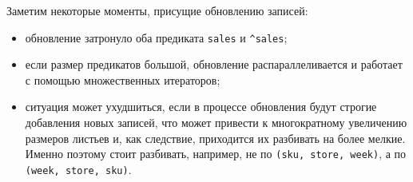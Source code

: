 Заметим некоторые моменты, присущие обновлению записей:

\begin{itemize}
  \item обновление затронуло оба предиката \lstinline{sales} и \lstinline{^sales};
  \item если размер предикатов большой, обновление распараллеливается и работает с помощью множественных итераторов;
  \item ситуация может ухудшиться, если в процессе обновления будут строгие добавления новых записей, что может привести к многократному увеличению размеров листьев и, как следствие, приходится их разбивать на более мелкие. Именно поэтому стоит разбивать, например, не по \lstinline{(sku, store, week)}, а по \lstinline{(week, store, sku)}.
\end{itemize}
